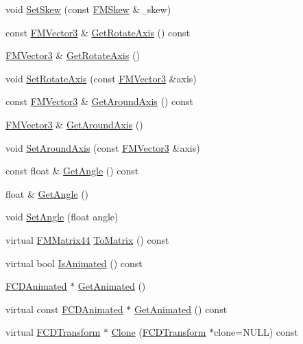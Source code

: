 \begin{DoxyCompactItemize}
\item 
void \hyperlink{classFCDTSkew_af1a6227aa617dd5ed74a711fe951551f}{SetSkew} (const \hyperlink{classFMSkew}{FMSkew} \&\_\-skew)
\item 
const \hyperlink{classFMVector3}{FMVector3} \& \hyperlink{classFCDTSkew_a3fc21e33c8a5af04410e09a1ed0d7275}{GetRotateAxis} () const 
\item 
\hyperlink{classFMVector3}{FMVector3} \& \hyperlink{classFCDTSkew_a56ecf1919695b36c9dfc1aa8bc3cb7dd}{GetRotateAxis} ()
\item 
void \hyperlink{classFCDTSkew_acf018bf27460abd2e354ae3461b294a6}{SetRotateAxis} (const \hyperlink{classFMVector3}{FMVector3} \&axis)
\item 
const \hyperlink{classFMVector3}{FMVector3} \& \hyperlink{classFCDTSkew_a1cf6d65244d940a70913f396c4a21394}{GetAroundAxis} () const 
\item 
\hyperlink{classFMVector3}{FMVector3} \& \hyperlink{classFCDTSkew_ab555994aa6923ca3be4ed628b0d0b78a}{GetAroundAxis} ()
\item 
void \hyperlink{classFCDTSkew_a3fc0739c9c4e57510e849217fa023890}{SetAroundAxis} (const \hyperlink{classFMVector3}{FMVector3} \&axis)
\item 
const float \& \hyperlink{classFCDTSkew_a6e2b73155535a7206383484a78b36f36}{GetAngle} () const 
\item 
float \& \hyperlink{classFCDTSkew_a7f573a6324acdc92b5e7a71d05e0a8d7}{GetAngle} ()
\item 
void \hyperlink{classFCDTSkew_a4c85901fe75248b2824053190d6f26bd}{SetAngle} (float angle)
\item 
virtual \hyperlink{classFMMatrix44}{FMMatrix44} \hyperlink{classFCDTSkew_ae7e90834c3ca578ebec91fcc0472e479}{ToMatrix} () const 
\item 
virtual bool \hyperlink{classFCDTSkew_a81f213b6eb3014df1129f806708e7d76}{IsAnimated} () const 
\item 
\hyperlink{classFCDAnimated}{FCDAnimated} $\ast$ \hyperlink{classFCDTSkew_a6637a68d104e66b0e8fb8b517f8ad345}{GetAnimated} ()
\item 
virtual const \hyperlink{classFCDAnimated}{FCDAnimated} $\ast$ \hyperlink{classFCDTSkew_a38aa6c4cdf590300a71be183fbad50a1}{GetAnimated} () const 
\item 
virtual \hyperlink{classFCDTransform}{FCDTransform} $\ast$ \hyperlink{classFCDTSkew_a7c79f16b0a6fbaddad4d15d5911a2443}{Clone} (\hyperlink{classFCDTransform}{FCDTransform} $\ast$clone=NULL) const 
\end{DoxyCompactItemize}


